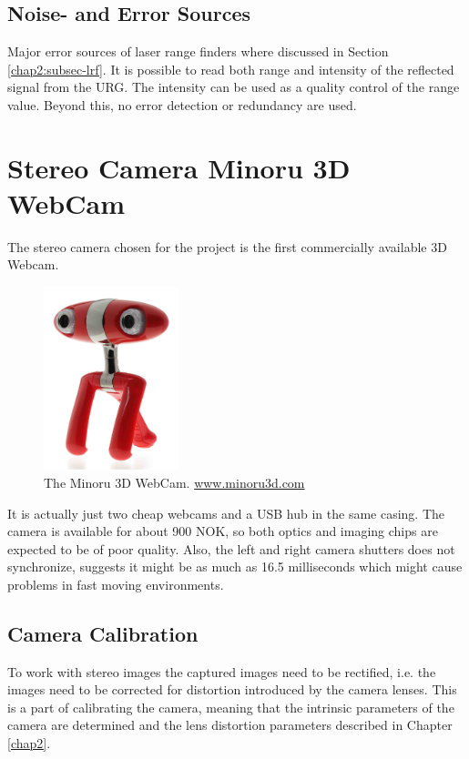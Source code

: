 \subsection{Noise- and Error Sources}
Major error sources of laser range finders where discussed in Section \ref{chap2:subsec-lrf}. It is
possible to read both range and intensity of the reflected signal from the URG. The
intensity can be used as a quality control of the range value. Beyond this, no error
detection or redundancy are used. 



\section{Stereo Camera Minoru 3D WebCam}
The stereo camera chosen for the project is the first commercially available 3D Webcam.
\begin{figure}[htbp]
    \centering
    \includegraphics[width=0.35\textwidth]{pics/minoru3d}
    \caption{The Minoru 3D WebCam. \url{www.minoru3d.com}}
    \label{chap3:fig-minoru}
\end{figure}
It is actually just two cheap webcams and a USB hub in the same casing. The camera is
available for about 900 NOK, so both optics and imaging chips are expected to be of poor
quality. Also, the left and right camera shutters does not synchronize, \cite{nma-web}
suggests it might be as much as 16.5 milliseconds which might cause problems in fast
moving environments. 


\subsection{Camera Calibration}
To work with stereo images the captured images need to be rectified, i.e. the images need
to be corrected for distortion introduced by the camera lenses. This is a part of
calibrating the camera, meaning that the intrinsic parameters of the camera are
determined and the lens distortion parameters described in Chapter \ref{chap2}.

